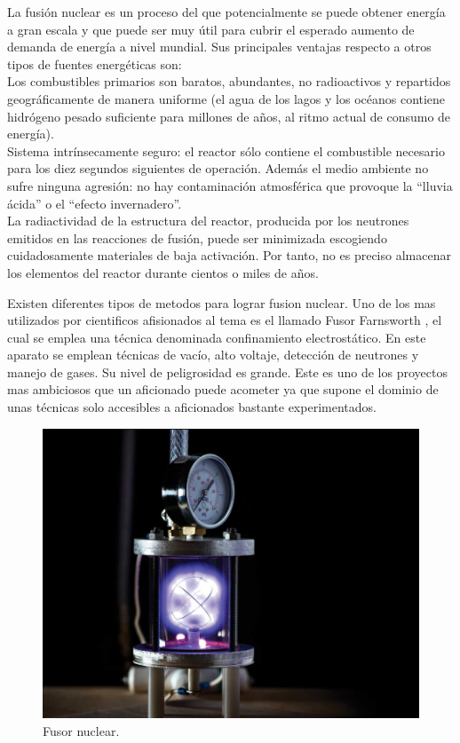 La fusión nuclear es un proceso del que potencialmente se puede obtener energía a gran escala y que puede ser muy útil para cubrir el esperado aumento de demanda de energía a nivel mundial. Sus principales ventajas respecto a otros tipos de fuentes energéticas son:\\

Los combustibles primarios son baratos, abundantes, no radioactivos y repartidos geográficamente de manera uniforme (el agua de los lagos y los océanos contiene hidrógeno pesado suficiente para millones de años, al ritmo actual de consumo de energía).\\

Sistema intrínsecamente seguro: el reactor sólo contiene el combustible necesario para los diez segundos siguientes de operación. Además el medio ambiente no sufre ninguna agresión: no hay contaminación atmosférica que provoque la “lluvia ácida” o el “efecto invernadero”.\\

La radiactividad de la estructura del reactor, producida por los neutrones emitidos en las reacciones de fusión, puede ser minimizada escogiendo cuidadosamente materiales de baja activación. Por tanto, no es preciso almacenar los elementos del reactor durante cientos o miles de años.\\ \cite{fusion}

Existen diferentes tipos de metodos para lograr fusion nuclear. Uno de los mas utilizados por cientificos afisionados al tema es el llamado Fusor Farnsworth \cite{fusor}, el cual se emplea una técnica denominada confinamiento electrostático. En este aparato se emplean técnicas de vacío, alto voltaje, detección de neutrones y manejo de gases. Su nivel de peligrosidad es grande. Este es uno de los proyectos mas ambiciosos que un aficionado puede acometer ya que supone el dominio de unas técnicas solo accesibles a aficionados bastante experimentados.


\begin{figure}[H]
\centering
\includegraphics[width=12cm]{capitulo3/figs/fusor.png}
\caption{ Fusor nuclear.}
\end{figure}

